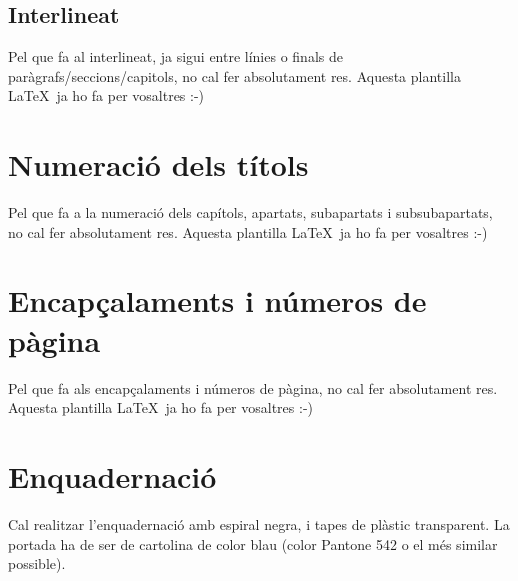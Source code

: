 \subsection{Interlineat}

Pel que fa al interlineat, ja sigui entre línies o finals de paràgrafs/seccions/capitols, no cal fer absolutament res. Aquesta plantilla \LaTeX \ ja ho fa per vosaltres :-)


\section{Numeració dels títols}

Pel que fa a la numeració dels capítols, apartats, subapartats i subsubapartats, no cal fer absolutament res. Aquesta plantilla \LaTeX \ ja ho fa per vosaltres :-)


\section{Encapçalaments i números de pàgina}

Pel que fa als encapçalaments i números de pàgina, no cal fer absolutament res. Aquesta plantilla \LaTeX \ ja ho fa per vosaltres :-)


\section{Enquadernació}

Cal realitzar l'enquadernació amb espiral negra, i tapes de plàstic transparent. La portada ha de ser de cartolina de color blau (color Pantone 542 o el més similar possible).

